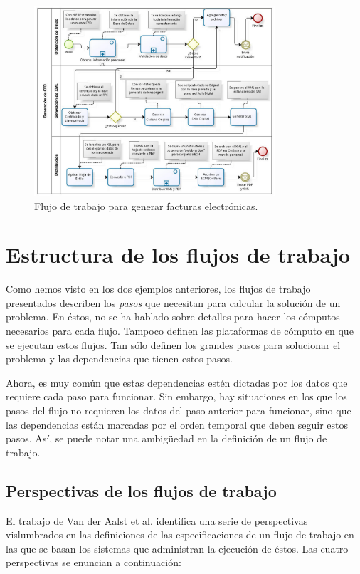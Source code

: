 \begin{figure}
    \begin{center}
        \includegraphics[width=0.8\textwidth]{imagenes/cfd-workflow}
    \end{center}
    \caption{Flujo de trabajo para generar facturas electrónicas.}
    \label{fig:cfd-workflow}
\end{figure}


\section{Estructura de los flujos de trabajo}
Como hemos visto en los dos ejemplos anteriores, los flujos de trabajo presentados describen los \emph{pasos} que necesitan para calcular la solución de un problema. En éstos, no se ha hablado sobre detalles para hacer los cómputos necesarios para cada flujo. Tampoco definen las plataformas de cómputo en que se ejecutan estos flujos. Tan sólo definen los grandes pasos para solucionar el problema y las dependencias que tienen estos pasos. 

Ahora, es muy común que estas dependencias estén dictadas por los datos que requiere cada paso para funcionar. Sin embargo, hay situaciones en los que los pasos del flujo no requieren los datos del paso anterior para funcionar, sino que las dependencias están marcadas por el orden temporal que deben seguir estos pasos. Así, se puede notar una ambigüedad en la definición de un flujo de trabajo.

\subsection{Perspectivas de los flujos de trabajo}
El trabajo de Van der Aalst et al. \cite{van2003workflow} identifica una serie de perspectivas vislumbrados en las definiciones de las especificaciones de un flujo de trabajo en las que se basan los sistemas que administran la ejecución de éstos. Las cuatro perspectivas se enuncian a continuación:

